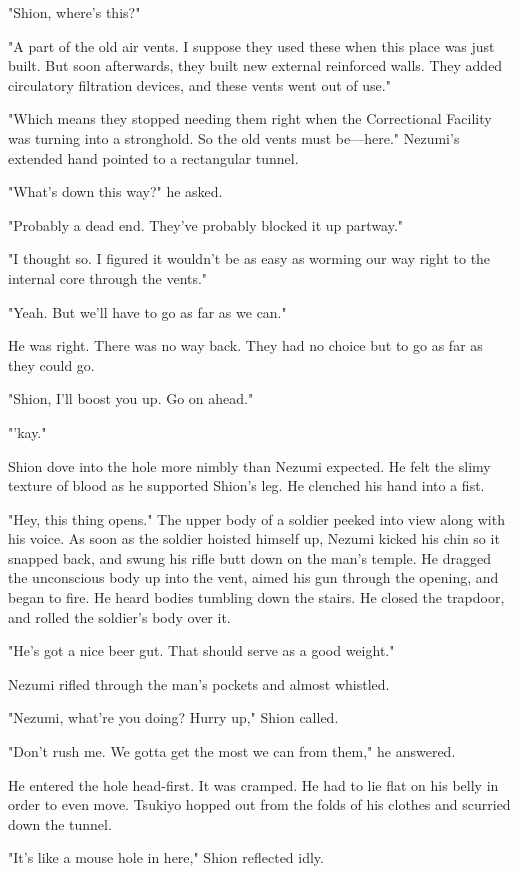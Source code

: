 "Shion, where's this?"

"A part of the old air vents. I suppose they used these when this place
was just built. But soon afterwards, they built new external reinforced
walls. They added circulatory filtration devices, and these vents went
out of use."

"Which means they stopped needing them right when the Correctional
Facility was turning into a stronghold. So the old vents must be---here."
Nezumi's extended hand pointed to a rectangular tunnel.

"What's down this way?" he asked.

"Probably a dead end. They've probably blocked it up partway."

"I thought so. I figured it wouldn't be as easy as worming our way right
to the internal core through the vents."

"Yeah. But we'll have to go as far as we can."

He was right. There was no way back. They had no choice but to go as far
as they could go.

"Shion, I'll boost you up. Go on ahead."

"'kay."

Shion dove into the hole more nimbly than Nezumi expected. He felt the
slimy texture of blood as he supported Shion's leg. He clenched his hand
into a fist.

"Hey, this thing opens." The upper body of a soldier peeked into view
along with his voice. As soon as the soldier hoisted himself up, Nezumi
kicked his chin so it snapped back, and swung his rifle butt down on the
man's temple. He dragged the unconscious body up into the vent, aimed
his gun through the opening, and began to fire. He heard bodies tumbling
down the stairs. He closed the trapdoor, and rolled the soldier's body
over it.

"He's got a nice beer gut. That should serve as a good weight."

Nezumi rifled through the man's pockets and almost whistled.

"Nezumi, what're you doing? Hurry up," Shion called.

"Don't rush me. We gotta get the most we can from them," he answered.

He entered the hole head-first. It was cramped. He had to lie flat on
his belly in order to even move. Tsukiyo hopped out from the folds of
his clothes and scurried down the tunnel.

"It's like a mouse hole in here," Shion reflected idly.

